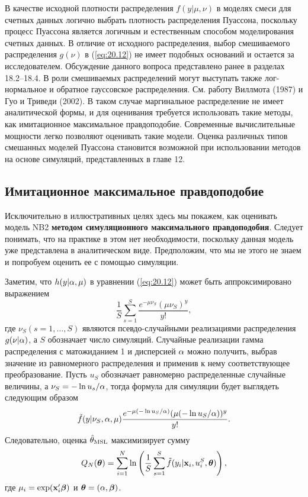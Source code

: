 В качестве исходной плотности распределения $f(y|\mu, \nu)$ в моделях смеси для счетных данных логично выбрать плотность распределения Пуассона, поскольку процесс Пуассона является логичным и естественным способом моделирования счетных данных. В отличие от исходного распределения, выбор смешиваемого распределения $g(\nu)$ в (\ref{eq:20.12}) не имеет подобных оснований и остается за исследователем. Обсуждение данного вопроса представлено ранее в разделах 18.2--18.4. В роли смешиваемых распределений могут выступать также лог-нормальное и обратное гауссовское распределения. См. работу Виллмота (1987) и Гуо и Триведи (2002). В таком случае маргинальное распределение не имеет аналитической формы, и для оценивания требуется использовать такие методы, как имитационное максимальное правдоподобие. Современные вычислительные мощности легко позволяют оценивать такие модели. Оценка различных типов смешанных моделей Пуассона становится возможной при использовании методов на основе симуляций, представленных в главе 12.


\subsection{Имитационное максимальное правдоподобие}\label{sec:20.4.2}

\noindent
Исключительно в иллюстративных целях здесь мы покажем, как оценивать модель NB2 \textbf{методом симуляционного максимального правдоподобия}. Следует понимать, что на практике в этом нет необходимости, поскольку данная модель уже представлена в аналитическом виде. Предположим, что мы не этого не знаем и попробуем оценить ее с помощью симуляции.

Заметим, что $h(y|\alpha, \mu)$ в уравнении (\ref{eq:20.12}) может быть аппроксимировано выражением
    $$\frac{1}{S}\sum^{S}_{s = 1} \frac{e^{-\mu\nu_S}(\mu\nu_S)^y}{y!},$$
где $\nu_S(s = 1, \ldots , S)$ являются псевдо-случайными реализациями распределения $g(\nu|\alpha)$, а $S$ обозначает число симуляций. Случайные реализации гамма распределения с матожиданием 1 и дисперсией $\alpha$ можно получить, выбрав значение из равномерного распределения и применив к нему соответствующее преобразование. Пусть $u_S$ обозначает равномерно распределенные случайные величины, а $\nu_S = -\ln u_s/\alpha$, тогда формула для симуляции будет выглядеть следующим образом
    $$\tilde{f}(y|\nu_S, \alpha, \mu)\frac{e^{-\mu(-\ln u_S / \alpha)}(\mu(-\ln u_S/\alpha))^y}{y!}.$$
Следовательно, оценка $\hat{\theta}_{\mathrm{MSL}}$ максимизирует сумму
    \begin{align}\label{eq:20.14}
    Q_N(\bm{\theta}) = \sum^{N}_{i = 1}\ln \left( \frac{1}{S}\sum^{S}_{s = 1}\tilde{f}(y_i|\mathbf{x}_i, u^S_i, \bm{\theta})\right),
    \end{align}
где $\mu_i = \exp(\mathbf{x}_i'\bm{\beta})$ и $\bm{\theta} = (\alpha, \bm{\beta})$.

